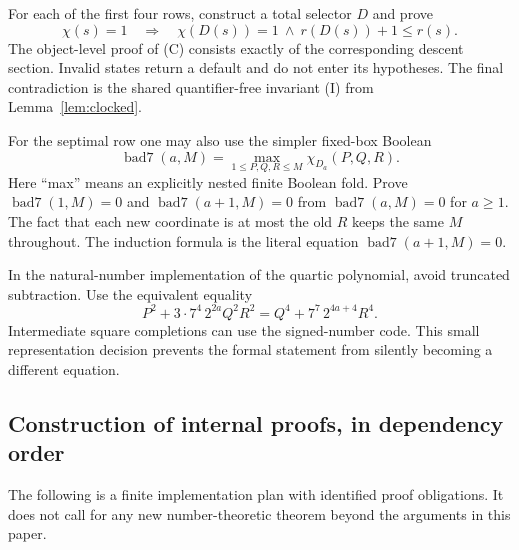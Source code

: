 For each of the first four rows, construct a total selector $D$ and prove
\[
 \chi(s)=1\quad\Longrightarrow\quad
       \chi(D(s))=1\ \wedge\ r(D(s))+1\leq r(s).
\tag{C}
\]
The object-level proof of (C) consists exactly of the corresponding
descent section. Invalid states return a default and do not enter its
hypotheses. The final contradiction is the shared quantifier-free
invariant (I) from Lemma~\ref{lem:clocked}.

For the septimal row one may also use the simpler fixed-box Boolean
\[
 \operatorname{bad7}(a,M)=
 \max_{1\leq P,Q,R\leq M}\chi_{D_a}(P,Q,R).
\]
Here ``max'' means an explicitly nested finite Boolean fold. Prove
$\operatorname{bad7}(1,M)=0$ and
$\operatorname{bad7}(a+1,M)=0$ from
$\operatorname{bad7}(a,M)=0$ for $a\geq1$. The fact that each new
coordinate is at most the old $R$ keeps the same $M$ throughout.
The induction formula is the literal equation
$\operatorname{bad7}(a+1,M)=0$.

In the natural-number implementation of the quartic polynomial, avoid
truncated subtraction. Use the equivalent equality
\[
 P^2+3\cdot7^4\,2^{2a}Q^2R^2
     =Q^4+7^7\,2^{4a+4}R^4.
\]
Intermediate square completions can use the signed-number code. This
small representation decision prevents the formal statement from
silently becoming a different equation.

\subsection{Construction of internal proofs, in dependency order}

The following is a finite implementation plan with identified proof
obligations. It does not call for any new number-theoretic theorem beyond
the arguments in this paper.

